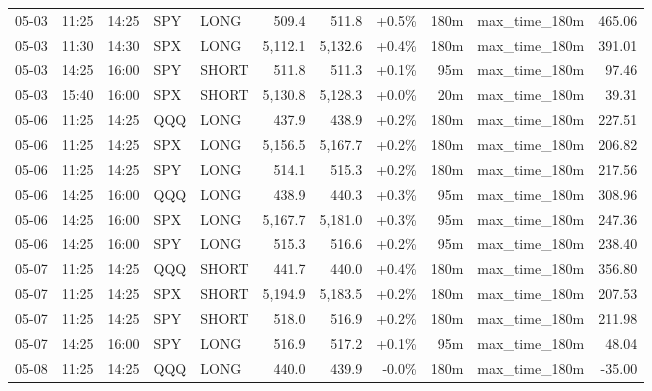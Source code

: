 \documentclass[11pt,a4paper,twoside]{article}
\begin{document}
\begin{center}
\begin{longtable}{>{\color{txtmain}}l l l l l r r r r >{\color{txtmain}}l r}
05-03 & 11:25 & 14:25 & SPY & LONG & 509.4 & 511.8 & \textcolor{wingreen}{+0.5\%} & 180m & max\_time\_180m & \textcolor{wingreen}{465.06} \\
05-03 & 11:30 & 14:30 & SPX & LONG & 5,112.1 & 5,132.6 & \textcolor{wingreen}{+0.4\%} & 180m & max\_time\_180m & \textcolor{wingreen}{391.01} \\
05-03 & 14:25 & 16:00 & SPY & SHORT & 511.8 & 511.3 & \textcolor{wingreen}{+0.1\%} & 95m & max\_time\_180m & \textcolor{wingreen}{97.46} \\
05-03 & 15:40 & 16:00 & SPX & SHORT & 5,130.8 & 5,128.3 & \textcolor{wingreen}{+0.0\%} & 20m & max\_time\_180m & \textcolor{wingreen}{39.31} \\
05-06 & 11:25 & 14:25 & QQQ & LONG & 437.9 & 438.9 & \textcolor{wingreen}{+0.2\%} & 180m & max\_time\_180m & \textcolor{wingreen}{227.51} \\
05-06 & 11:25 & 14:25 & SPX & LONG & 5,156.5 & 5,167.7 & \textcolor{wingreen}{+0.2\%} & 180m & max\_time\_180m & \textcolor{wingreen}{206.82} \\
05-06 & 11:25 & 14:25 & SPY & LONG & 514.1 & 515.3 & \textcolor{wingreen}{+0.2\%} & 180m & max\_time\_180m & \textcolor{wingreen}{217.56} \\
05-06 & 14:25 & 16:00 & QQQ & LONG & 438.9 & 440.3 & \textcolor{wingreen}{+0.3\%} & 95m & max\_time\_180m & \textcolor{wingreen}{308.96} \\
05-06 & 14:25 & 16:00 & SPX & LONG & 5,167.7 & 5,181.0 & \textcolor{wingreen}{+0.3\%} & 95m & max\_time\_180m & \textcolor{wingreen}{247.36} \\
05-06 & 14:25 & 16:00 & SPY & LONG & 515.3 & 516.6 & \textcolor{wingreen}{+0.2\%} & 95m & max\_time\_180m & \textcolor{wingreen}{238.40} \\
05-07 & 11:25 & 14:25 & QQQ & SHORT & 441.7 & 440.0 & \textcolor{wingreen}{+0.4\%} & 180m & max\_time\_180m & \textcolor{wingreen}{356.80} \\
05-07 & 11:25 & 14:25 & SPX & SHORT & 5,194.9 & 5,183.5 & \textcolor{wingreen}{+0.2\%} & 180m & max\_time\_180m & \textcolor{wingreen}{207.53} \\
05-07 & 11:25 & 14:25 & SPY & SHORT & 518.0 & 516.9 & \textcolor{wingreen}{+0.2\%} & 180m & max\_time\_180m & \textcolor{wingreen}{211.98} \\
05-07 & 14:25 & 16:00 & SPY & LONG & 516.9 & 517.2 & \textcolor{wingreen}{+0.1\%} & 95m & max\_time\_180m & \textcolor{wingreen}{48.04} \\
05-08 & 11:25 & 14:25 & QQQ & LONG & 440.0 & 439.9 & \textcolor{lossred}{-0.0\%} & 180m & max\_time\_180m & \textcolor{lossred}{-35.00} \\

\end{longtable}
\end{center}
\end{document}
